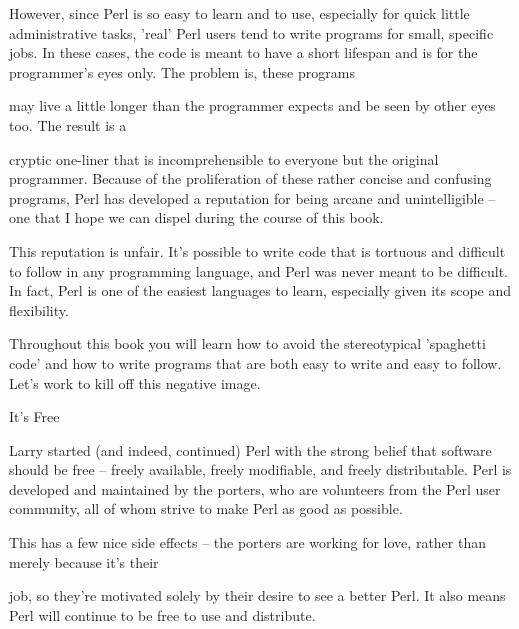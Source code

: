 \documentclass[a4paper,11pt]{book}
\begin{document}
\noindent 

\noindent However, since Perl is so easy to learn and to use, especially for quick little administrative tasks, 'real' Perl users tend to write programs for small, specific jobs. In these cases, the code is meant to have a short lifespan and is for the programmer's eyes only. The problem is, these programs

\noindent 

\noindent 

\noindent may live a little longer than the programmer expects and be seen by other eyes too. The result is a

\noindent cryptic one-liner that is incomprehensible to everyone but the original programmer. Because of the proliferation of these rather concise and confusing programs, Perl has developed a reputation for being arcane and unintelligible -- one that I hope we can dispel during the course of this book.

\noindent 

\noindent This reputation is unfair. It's possible to write code that is tortuous and difficult to follow in any programming language, and Perl was never meant to be difficult. In fact, Perl is one of the easiest languages to learn, especially given its scope and flexibility.

\noindent 

\noindent Throughout this book you will learn  how  to  avoid  the  stereotypical  'spaghetti  code'  and  how  to  write programs that are both easy to  write  and  easy  to  follow.  Let's  work  to  kill  off this negative image.

\noindent 

\noindent It's Free

\noindent 

\noindent Larry started (and indeed, continued) Perl with the strong belief that software should be free -- freely available, freely modifiable, and freely distributable. Perl is developed and maintained by the porters, who are volunteers from the Perl user community, all of whom strive to make Perl as good as possible.

\noindent 

\noindent This has a few nice side effects -- the porters are working for love, rather than merely because it's their

\noindent job, so they're motivated solely by their desire to see a better Perl. It also means Perl will continue to be free to use and distribute.
\end{document}
